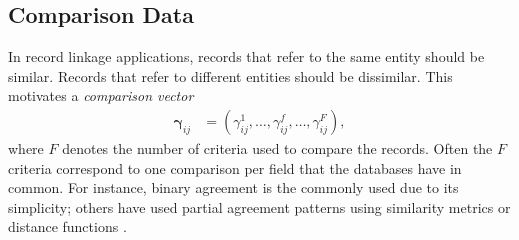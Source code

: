 \documentclass[ba]{imsart}
\newcommand{\bGamma}{\boldsymbol{\Gamma}}
\newcommand{\bgamma}{\boldsymbol{\gamma}}
\begin{document}
\subsection{Comparison Data}
\label{sec:comparison}

In record linkage applications, records that refer to the same entity should be similar. Records that refer to different entities should be dissimilar. This motivates a \textit{comparison vector} 
\begin{align}
\bgamma_{ij} &= (\gamma_{ij}^1, \ldots, \gamma_{ij}^f, \ldots, \gamma_{ij}^F),
\end{align}
where $F$ denotes the number of criteria used to compare the records. Often the $F$ criteria correspond to one comparison per field that the databases have in common. For instance, binary agreement is the commonly used due to its simplicity; others have used partial agreement patterns using similarity metrics or distance functions \citep{sadinle_bayesian_2017}. 


\end{document}
